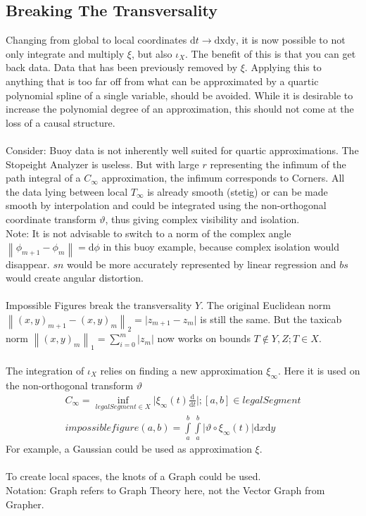 \documentclass{report}
\newcommand\norm[1]{\left\lVert#1\right\rVert}
\begin{document}
\subsection{Breaking The Transversality}
Changing from global to local coordinates $\mathrm{d}t\rightarrow\mathrm{dx}\mathrm{dy}$, it is now possible to not only integrate and multiply $\xi$, but also $\iota_{X}$. The benefit of this is that you can get back data. Data that has been previously removed by $\xi$. Applying this to anything that is too far off from what can be approximated by a quartic polynomial spline of a single variable, should be avoided. While it is desirable to increase the polynomial degree of an approximation, this should not come at the loss of a causal structure.\\\\
Consider: Buoy data is not inherently well suited for quartic approximations. The Stopeight Analyzer is useless. But with large $r$ representing the infimum of the path integral of a $C_{\infty}$ approximation, the infimum corresponds to Corners. All the data lying between local $T_{\infty}$ is already smooth (stetig) or can be made smooth by interpolation and could be integrated using the non-orthogonal coordinate transform $\vartheta$, thus giving complex visibility and isolation.\\
Note: It is not advisable to switch to a norm of the complex angle $\norm{\phi_{m+1}-\phi_{m}}=\mathrm{d}\phi$ in this buoy example, because complex isolation would disappear. $sn$ would be more accurately represented by linear regression and $bs$ would create angular distortion.\\\\
Impossible Figures break the transversality $Y$. The original Euclidean norm $\norm{(x,y)_{m+1}-(x,y)_{m}}_2 = \lvert z_{m+1}-z_{m} \rvert$ is still the same. But the taxicab norm $\norm{(x,y)_{m}}_1 = \sum \limits _{i=0}^{m} \lvert z_{m} \rvert$ now works on bounds $T \not \in Y,Z; T \in X$.\\\\
The integration of $\iota_{X}$ relies on finding a new approximation $\xi_{\infty}$. Here it is used on the non-orthogonal transform $\vartheta$
\begin{align}
C_{\infty}=\inf_{legalSegment \in X} \lvert \xi_{\infty}(t) \frac{\mathrm{d}}{\mathrm{d}t} \rvert; [a,b] \in legalSegment\\
impossiblefigure(a,b)=\int \limits _{a}^{b} \int \limits _{a}^{b} \lvert\vartheta \circ \xi_{\infty} (t)\rvert\mathrm{d}x\mathrm{d}y
\end{align}
For example, a Gaussian could be used as approximation $\xi$.\\\\
To create local spaces, the knots of a Graph could be used.\\
Notation: Graph refers to Graph Theory here, not the Vector Graph from Grapher.
\end{document}

